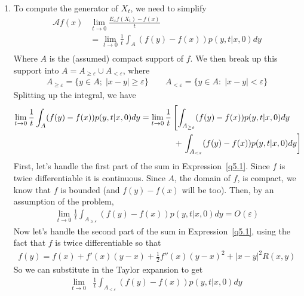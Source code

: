\documentclass[12pt]{article}
\theoremstyle{plain}
\theoremstyle{definition}
\theoremstyle{remark}
\begin{document}
\begin{enumerate}
\begin{enumerate}
    \end{enumerate}
  \item %
    To compute the generator of $X_t$, we need to simplify
    \begin{align*}
      \mathcal{A}f(x)
        & \lim_{t\rightarrow0}
        \frac{E_xf(X_t) - f(x)}{t} \\
        &= \lim_{t\rightarrow0} \frac{1}{t}
        \int_A (f(y)-f(x))p(y,t|x,0) dy\\
    \end{align*}
    Where $A$ is the (assumed) compact support of $f$. We then break up
    this support into $A = A_{\geq\varepsilon} \cup A_{<\varepsilon}$, where
    \begin{align*}
      A_{\geq\varepsilon} = \{y \in A;\; |x-y| \geq \varepsilon\}
      \qquad
      A_{<\varepsilon} = \{y \in A:\; |x-y| < \varepsilon\}
    \end{align*}
    Splitting up the integral, we have
    \begin{align}
      \lim_{t\rightarrow0} \frac{1}{t}
      \int_A (f(y)-f(x))p(y,t|x,0) dy
      &= \lim_{t\rightarrow0} \frac{1}{t}
        \left[
        \int_{A_{\geq\varepsilon}} (f(y)-f(x))p(y,t|x,0) dy \right.
        \label{q5.1}
        \\
        &\qquad \qquad +\left.
        \int_{A_{<\varepsilon}} (f(y)-f(x))p(y,t|x,0) dy
      \right]\notag
    \end{align}
    First, let's handle the first part of the sum in
    Expression~\ref{q5.1}. Since $f$ is twice differentiable it is
    continuous.  Since $A$, the domain of $f$, is compact, we know that
    $f$ is bounded (and $f(y)-f(x)$ will be too). Then, by an assumption
    of the problem,
    \begin{align*}
      \lim_{t\rightarrow0} \frac{1}{t}
        \int_{A_{\geq\varepsilon}} (f(y)-f(x))p(y,t|x,0) dy
      = O(\varepsilon)
    \end{align*}
    Now let's handle the second part of the sum in
    Expression~\ref{q5.1}, using the fact that $f$ is twice
    differentiable so that
    \begin{align*}
      f(y) = f(x)+f'(x)(y-x)+\frac{1}{2}f''(x)(y-x)^2 + |x-y|^2R(x,y)
    \end{align*}
    So we can substitute in the Taylor expansion to get
    \begin{align*}
      \lim_{t\rightarrow0} &\frac{1}{t}
        \int_{A_{<\varepsilon}} (f(y)-f(x))p(y,t|x,0) dy
        \\

\end{align*}
\end{enumerate}
\end{document}
